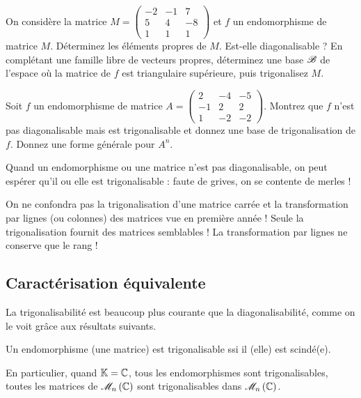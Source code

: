 \begin{exo}
On considère la matrice \(M=\begin{pmatrix}
-2 & -1 & 7 \\
5 & 4 & -8 \\
1 & 1 & 1
\end{pmatrix}\) et \(f\) un endomorphisme de matrice \(M\). Déterminez les éléments propres de \(M\). Est-elle diagonalisable ? En complétant une famille libre de vecteurs propres, déterminez une base \(\mathscr{B}\) de l'espace où la matrice de \(f\) est triangulaire supérieure, puis trigonalisez \(M\).
\end{exo}

\begin{exo}
Soit \(f\) un endomorphisme de matrice \(A=\begin{pmatrix}
2 & -4 & -5 \\
-1 & 2 & 2 \\
1 & -2 & -2
\end{pmatrix}\). Montrez que \(f\) n'est pas diagonalisable mais est trigonalisable et donnez une base de trigonalisation de \(f\). Donnez une forme générale pour \(A^n\).
\end{exo}

Quand un endomorphisme ou une matrice n'est pas diagonalisable, on peut espérer qu'il ou elle est trigonalisable : faute de grives, on se contente de merles !

\begin{rem}
On ne confondra pas la trigonalisation d'une matrice carrée et la transformation par lignes (ou colonnes) des matrices vue en première année ! Seule la trigonalisation fournit des matrices semblables ! La transformation par lignes ne conserve que le rang !
\end{rem}

\subsection{Caractérisation équivalente}

La trigonalisabilité est beaucoup plus courante que la diagonalisabilité, comme on le voit grâce aux résultats suivants.

\begin{prop}
Un endomorphisme (une matrice) est trigonalisable ssi il (elle) est scindé(e).
\end{prop}

En particulier, quand \(\mathbb{K}=\mathbb{C}\), tous les endomorphismes sont trigonalisables, toutes les matrices de \(\M{n}[\C]\) sont trigonalisables dans \(\M{n}[\C]\).

